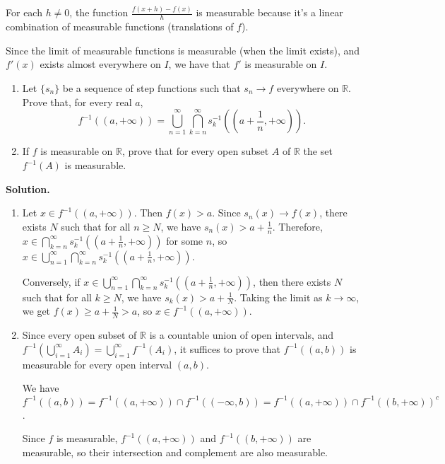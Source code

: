 For each $h \neq 0$, the function $\frac{f(x + h) - f(x)}{h}$ is measurable because it's a linear combination of measurable functions (translations of $f$).

Since the limit of measurable functions is measurable (when the limit exists), and $f'(x)$ exists almost everywhere on $I$, we have that $f'$ is measurable on $I$.

\begin{problembox}
\begin{enumerate}[label=(\alph*)]
    \item Let $\{s_n\}$ be a sequence of step functions such that $s_n \to f$ everywhere on $\mathbb{R}$. Prove that, for every real $a$,
    \[f^{-1}((a, +\infty)) = \bigcup_{n=1}^\infty \bigcap_{k=n}^\infty s_k^{-1} \left( \left( a + \frac{1}{n}, +\infty \right) \right).\]
    \item If $f$ is measurable on $\mathbb{R}$, prove that for every open subset $A$ of $\mathbb{R}$ the set $f^{-1}(A)$ is measurable.
\end{enumerate}
\end{problembox}

\noindent\textbf{Solution.}
\begin{enumerate}[label=(\alph*)]
    \item Let $x \in f^{-1}((a, +\infty))$. Then $f(x) > a$. Since $s_n(x) \to f(x)$, there exists $N$ such that for all $n \geq N$, we have $s_n(x) > a + \frac{1}{n}$. Therefore, $x \in \bigcap_{k=n}^\infty s_k^{-1}((a + \frac{1}{n}, +\infty))$ for some $n$, so $x \in \bigcup_{n=1}^\infty \bigcap_{k=n}^\infty s_k^{-1}((a + \frac{1}{n}, +\infty))$.
    
    Conversely, if $x \in \bigcup_{n=1}^\infty \bigcap_{k=n}^\infty s_k^{-1}((a + \frac{1}{n}, +\infty))$, then there exists $N$ such that for all $k \geq N$, we have $s_k(x) > a + \frac{1}{N}$. Taking the limit as $k \to \infty$, we get $f(x) \geq a + \frac{1}{N} > a$, so $x \in f^{-1}((a, +\infty))$.
    
    \item Since every open subset of $\mathbb{R}$ is a countable union of open intervals, and $f^{-1}(\bigcup_{i=1}^{\infty} A_i) = \bigcup_{i=1}^{\infty} f^{-1}(A_i)$, it suffices to prove that $f^{-1}((a, b))$ is measurable for every open interval $(a, b)$.
    
    We have $f^{-1}((a, b)) = f^{-1}((a, +\infty)) \cap f^{-1}((-\infty, b)) = f^{-1}((a, +\infty)) \cap f^{-1}((b, +\infty))^c$.
    
    Since $f$ is measurable, $f^{-1}((a, +\infty))$ and $f^{-1}((b, +\infty))$ are measurable, so their intersection and complement are also measurable.
\end{enumerate}

